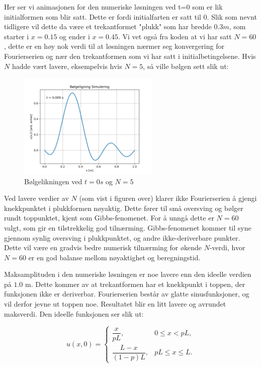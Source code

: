 Her ser vi animasjonen for den numeriske løsningen ved t=0 som er lik initialformen som blir satt. Dette er fordi initialfarten er satt til $0$.
Slik som nevnt tidligere vil dette da være et trekantformet "plukk" som  har bredde $0.3m$, som starter i $x=0.15$ og ender i $x=0.45$. Vi 
vet også fra koden at vi har satt $N=60$, dette er en høy nok verdi til at løsningen nærmer seg konvergering for Fourierserien og nær den trekantformen som vi har satt i 
initialbetingelsene. Hvis $N$ hadde vært lavere, eksempelvis hvis $N=5$, så ville bølgen sett slik ut:

\begin{figure}[H]
	\centering
	\includegraphics[width=0.6\textwidth]{figurer/bolgeligning_t0_n5.png}
	\caption{Bølgelikningen ved $t=0s$ og $N=5$}
	\label{fig:BolgelikningVedT0OgN5}
\end{figure}

Ved lavere verdier av $N$ (som vist i figuren over) klarer ikke Fourierserien å gjengi knekkpunktet i plukkformen nøyaktig. Dette fører til 
små oversving og bølger rundt toppunktet, kjent som Gibbs-fenomenet. For å unngå dette er $N=60$ valgt, som gir en tilstrekkelig god tilnærming.
Gibbs-fenomenet kommer til syne gjennom synlig oversving i plukkpunktet, og andre ikke-deriverbare punkter. Dette vil være en gradvis bedre numerisk
tilnærming for økende $N$-verdi, hvor $N=60$ er en god balanse mellom nøyaktighet og beregningstid.

Maksamplituden i den numeriske løsningen er noe lavere enn den ideelle verdien på $1.0$ m. Dette kommer av at trekantformen har et knekkpunkt i toppen, 
der funksjonen ikke er deriverbar. Fourierserien består av glatte sinusfunksjoner, og vil derfor jevne ut toppen noe. Resultatet blir en litt lavere og avrundet maksverdi. 
Den ideelle funksjonen ser slik ut:

\begin{equation*}
    u(x,0) =
        \begin{cases}
        \dfrac{x}{pL}, & 0 \le x < pL, \\[6pt]
        \dfrac{L - x}{(1 - p)L}, & pL \le x \le L.
        \end{cases}
\end{equation*}

